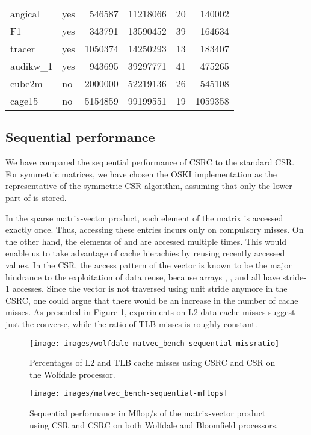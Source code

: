 \documentclass[11pt]{article}
\begin{document}
\begin{table}[!t]
{\begin{tabularx}{0.485\textwidth}{@{}l@{\ \ }l@{\ \ }r@{\ \ }r@{\ \ }r@{\ \ }r@{}}
angical & yes & 546587 & 11218066 & 20 & 140002 \\
F1 & yes & 343791 & 13590452 & 39 & 164634 \\
tracer & yes & 1050374 & 14250293 & 13 & 183407 \\
audikw\_1 & yes & 943695 & 39297771 & 41 & 475265 \\
cube2m & no & 2000000 & 52219136 & 26 & 545108 \\
cage15 & no & 5154859 & 99199551 & 19 & 1059358 \\
\bottomrule
\end{tabularx}}
\end{table}

\subsection{Sequential performance}

We have compared the sequential performance of CSRC to the standard CSR.
For symmetric matrices, we have chosen the OSKI implementation \cite{LVDY04a}
as the representative of the symmetric CSR algorithm, assuming that only the
lower part of  is stored.

In the sparse matrix-vector product, each element of the matrix is accessed
exactly once.  Thus, accessing these entries incurs only on compulsory misses.
On the other hand, the elements of  and  are accessed multiple times.
This would enable us to take advantage of cache hierachies by
reusing recently accessed values.  In the CSR, the access pattern of the 
vector is known to be the major hindrance to the exploitation of data reuse,
because arrays , ,  and  all have stride-1 accesses. Since the
 vector is not traversed using unit stride anymore in the CSRC, one could argue
that there would be an increase in the number of cache misses.  As
presented in Figure \ref{fig:missratio}, experiments on L2 data cache misses
suggest just the converse, while the ratio of TLB misses is roughly constant.

\begin{figure}[t]
\centering
\texttt{[image: images/wolfdale-matvec\_bench-sequential-missratio]}
\caption{Percentages of L2 and TLB cache misses
using CSRC and CSR on the
Wolfdale processor.}
\label{fig:missratio}
\end{figure}

\begin{figure}[t]
\centering
\texttt{[image: images/matvec\_bench-sequential-mflops]}
\caption{Sequential performance in Mflop/s of the matrix-vector
product using CSR and CSRC on both Wolfdale and Bloomfield processors.}
\label{fig:matvec_bench-sequential-mflops}
\end{figure}
\end{document}
